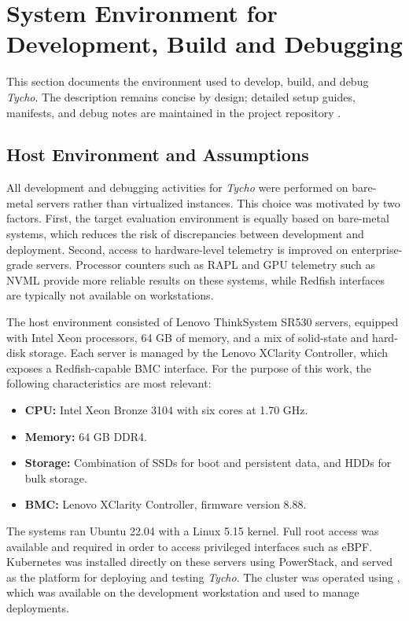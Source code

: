 \section{System Environment for Development, Build and Debugging}
\label{sec:tycho_sysenv}
This section documents the environment used to develop, build, and debug \textit{Tycho}. The description remains concise by design; detailed setup guides, manifests, and debug notes are maintained in the project repository \cite{TychoRepo}.


\subsection{Host Environment and Assumptions}
\label{sec:tycho_sysenv_host}

All development and debugging activities for \textit{Tycho} were performed on bare-metal servers rather than virtualized instances. This choice was motivated by two factors. First, the target evaluation environment is equally based on bare-metal systems, which reduces the risk of discrepancies between development and deployment. Second, access to hardware-level telemetry is improved on enterprise-grade servers. Processor counters such as RAPL and GPU telemetry such as NVML provide more reliable results on these systems, while Redfish interfaces are typically not available on workstations.

The host environment consisted of Lenovo ThinkSystem SR530 servers, equipped with Intel Xeon processors, 64 GB of memory, and a mix of solid-state and hard-disk storage. Each server is managed by the Lenovo XClarity Controller, which exposes a Redfish-capable BMC interface. For the purpose of this work, the following characteristics are most relevant:
\begin{itemize}
    \item \textbf{CPU:} Intel Xeon Bronze 3104 with six cores at 1.70 GHz.
    \item \textbf{Memory:} 64 GB DDR4.
    \item \textbf{Storage:} Combination of SSDs for boot and persistent data, and HDDs for bulk storage.
    \item \textbf{BMC:} Lenovo XClarity Controller, firmware version 8.88.
\end{itemize}

The systems ran Ubuntu 22.04 with a Linux 5.15 kernel. Full root access was available and required in order to access privileged interfaces such as eBPF. Kubernetes was installed directly on these servers using PowerStack\cite{PowerStack}, and served as the platform for deploying and testing \textit{Tycho}. The cluster was operated using , which was available on the development workstation and used to manage deployments. 

